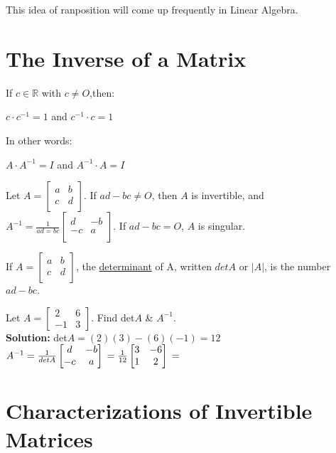 \documentclass{report}
\begin{document}
\begin{remark}
This idea of ranposition will come up frequently in Linear Algebra.
\end{remark}

\section{The Inverse of a Matrix}
\begin{definition}
If $c \in \mathbb{R}$ with $c \neq O$,then:
\begin{center}
$c \cdot c^{-1} = 1$ and $c^{-1} \cdot c = 1$
\end{center}
In other words:
\begin{center}
	$A \cdot A^{-1} = I$ and $A^{-1} \cdot A = I$
\end{center}
\end{definition}

\begin{example}
Let $A = \begin{bmatrix}
a & b \\
c & d \\
\end{bmatrix}$.
If $ad-bc \neq O$, then $A$ is invertible, and $A^{-1} = \frac{1}{ad=bc}\begin{bmatrix}
	d & -b \\
	-c & a \\
\end{bmatrix}$. If $ad - bc = O$, $A$ is singular.
\end{example}

\begin{definition}
If $A = \begin{bmatrix}
	a & b \\
	c & d \\
	\end{bmatrix}$, the \underline{determinant} of A, written $detA$ or $|A|$, is the number $ad - bc$.
\end{definition}

\begin{example}
Let $A = \begin{bmatrix} 2 & 6 \\ -1 & 3 \end{bmatrix}$. Find det$A$ \& $A^{-1}$.\\
\smallskip\textbf{Solution:}
det$A = (2)(3) - (6)(-1) = 12$\\
$A^{-1} = \frac{1}{det A}\begin{bmatrix} d & -b \\ -c & a \end{bmatrix}\\
= \frac{1}{12} \begin{bmatrix} 3 & -6 \\ 1 & 2 \end{bmatrix}\\
= $
\end{example}

\section{Characterizations of Invertible Matrices}
\end{document}
